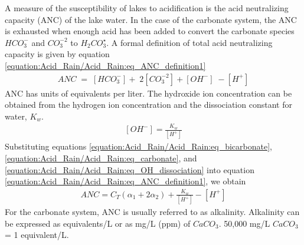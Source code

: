 \documentclass[letterpaper,10pt,english]{sphinxmanual}
\begin{document}
A measure of the susceptibility of lakes to acidification is the acid neutralizing capacity (ANC) of the lake water. In the case of the carbonate system, the ANC is exhausted when enough acid has been added to convert the carbonate species \({HCO}_{{3}}^{{-}}\)  and \({CO}_{{3}}^{{-2}}\) to \({H}_{{2}} {CO}_{{3}}^\star\). A formal definition of total acid neutralizing capacity is given by equation \eqref{equation:Acid_Rain/Acid_Rain:eq_ANC_definition1}
\begin{equation}\label{equation:Acid_Rain/Acid_Rain:eq_ANC_definition1}
\begin{split} {ANC\; }={\; }\left[{HCO}_{{3}}^{{-}} \right]+{\; 2}\left[{CO}_{{3}}^{{-2}} \right]+\left[{OH}^{{-}} \right]{\; -}\left[{H}^{+} \right]\end{split}
\end{equation}
ANC has units of equivalents per liter. The hydroxide ion concentration can be obtained from the hydrogen ion concentration and the dissociation constant for water, \(K_w\).
\begin{equation}\label{equation:Acid_Rain/Acid_Rain:eq_OH_dissociation}
\begin{split} \left[{OH}^{{-}} \right] = \frac{K_w}{\left[H^+\right]}\end{split}
\end{equation}
Substituting equations \eqref{equation:Acid_Rain/Acid_Rain:eq_bicarbonate}, \eqref{equation:Acid_Rain/Acid_Rain:eq_carbonate}, and \eqref{equation:Acid_Rain/Acid_Rain:eq_OH_dissociation} into equation \eqref{equation:Acid_Rain/Acid_Rain:eq_ANC_definition1}, we obtain
\begin{equation}\label{equation:Acid_Rain/Acid_Rain:eq_ANC_nonvolatile}
\begin{split} ANC=C_T \left(\alpha_1 +2\alpha_2 \right)+\frac{K_w}{\left[H^+ \right]} - \left[H^+ \right]\end{split}
\end{equation}
For the carbonate system, ANC is usually referred to as alkalinity. Alkalinity can be expressed as equivalents/L or as mg/L (ppm) of \(CaCO_3\). 50,000 mg/L \(CaCO_3\) = 1 equivalent/L.
\end{document}
